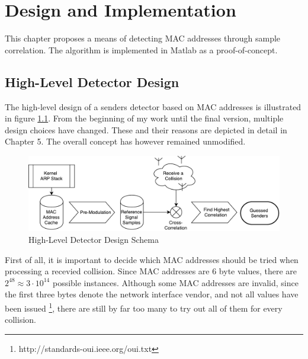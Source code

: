 
\chapter{Design and Implementation}\label{ch:design}
\glsresetall %

This chapter proposes a means of detecting \gls{MAC} addresses through sample correlation. The algorithm is implemented in Matlab as a proof-of-concept.



\section{High-Level Detector Design}

The high-level design of a senders detector based on \gls{MAC} addresses is illustrated in figure \ref{fig:blockdesign}. From the beginning of my work until the final version, multiple design choices have changed. These and their reasons are depicted in detail in Chapter 5. The overall concept has however remained unmodified.

\begin{figure}[H]
	\centering
	\includegraphics[width=\textwidth]{gfx/images/detector-block-design}
	\caption[High-Level Detector Design Schema]{High-Level Detector Design Schema}
	\label{fig:blockdesign}
\end{figure}

First of all, it is important to decide which \gls{MAC} addresses should be tried when processing a recevied collision. Since \gls{MAC} addresses are 6 byte values, there are $2^{48} \approx 3 \cdot 10^{14}$ possible instances. Although some \gls{MAC} addresses are invalid, since the first three bytes denote the network interface vendor, and not all values have been issued \footnote{http://standards-oui.ieee.org/oui.txt}, there are still by far too many to try out all of them for every collision.

